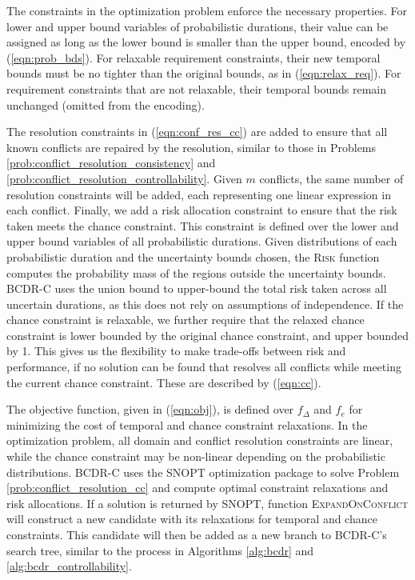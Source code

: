 \documentclass[jair,twoside,11pt,theapa]{article}
\begin{document}
The constraints in the optimization problem enforce the necessary properties.
For lower and upper bound variables of probabilistic durations, their value can
be assigned as long as the lower bound is smaller than the upper bound,
encoded by (\ref{eqn:prob_bds}). For relaxable requirement constraints, their new
temporal bounds must be no tighter than the original bounds, as in
(\ref{eqn:relax_req}). For requirement constraints that are not relaxable, their
temporal bounds remain unchanged (omitted from the encoding).


The resolution constraints in (\ref{eqn:conf_res_cc}) are added to ensure that
all known conflicts are repaired by the resolution, similar to those in Problems
\ref{prob:conflict_resolution_consistency} and \ref{prob:conflict_resolution_controllability}. Given $m$ conflicts, the same number
of resolution constraints will be added, each representing one linear expression
in each conflict. Finally, we add a risk allocation constraint to ensure that
the risk taken meets the chance constraint. This constraint is defined over the
lower and upper bound variables of all probabilistic durations. Given
distributions of each probabilistic duration and the uncertainty bounds chosen,
the \textsc{Risk} function computes the probability mass of the regions outside
the uncertainty bounds. BCDR-C uses the union bound to upper-bound the total
risk taken across all uncertain durations, as this does not rely on assumptions
of independence. If the chance constraint is relaxable, we further require that
the relaxed chance constraint is lower bounded by the original chance
constraint, and upper bounded by 1. This gives us the flexibility to make
trade-offs between risk and performance, if no solution can be found that
resolves all conflicts while meeting the current chance constraint. These are
described by (\ref{eqn:cc}).


The objective function, given in (\ref{eqn:obj}), is defined over $f_\Delta$ and
$f_{e}$ for minimizing the cost of temporal and chance constraint relaxations.
In the optimization problem, all domain and conflict resolution constraints are
linear, while the chance constraint may be non-linear depending on the
probabilistic distributions. BCDR-C uses the SNOPT optimization package
\cite{Wachter06onthe} to solve Problem \ref{prob:conflict_resolution_cc} and
compute optimal constraint relaxations and risk allocations. If a solution is
returned by SNOPT, function \textsc{ExpandOnConflict} will construct a new
candidate with its relaxations for temporal and chance constraints. This
candidate will then be added as a new branch to BCDR-C's search tree, similar to
the process in Algorithms \ref{alg:bcdr} and \ref{alg:bcdr_controllability}. 
\end{document}
